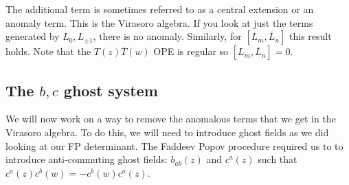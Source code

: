 \documentclass[11pt, oneside]{article}   	%
\theoremstyle{slanted}
\begin{document}
The additional term is sometimes referred to as a 
central extension or an anomaly term. 
This is the Virasoro algebra. If you look 
at just the terms generated by $ L _ 0 , L _{ \pm 1 } $, there is no 
anomaly. 
Similarly, for $ \left[  \overline{ L } _ m , \overline{ L } _ n  \right]  $ 
this result holds. Note that the 
$ T \left( z    \right)  \overline{ T } \left( w  \right)  $ OPE 
is regular so $ \left[  L _ m , \overline{ L } _ n  \right]   = 0 $. 
 
\subsection{The $ b , c $ ghost system}
We will now work on a way to 
remove the anomalous terms that we 
get in the Virasoro algebra. To do this, we 
will need to introduce ghost fields as we did 
looking at our FP determinant. 
The Faddeev Popov procedure 
required us to to introduce 
anti-commuting ghost fields: $ b _{ ab } \left(  z  \right)   $ 
and $ c ^ a \left( z  \right)  $ such that 
$ c ^ a \left( z   \right)  c ^ b \left(  w  \right)   = - c ^ b \left(  w  \right)  c ^ a \left(  z \right)  $. 
\end{document}
